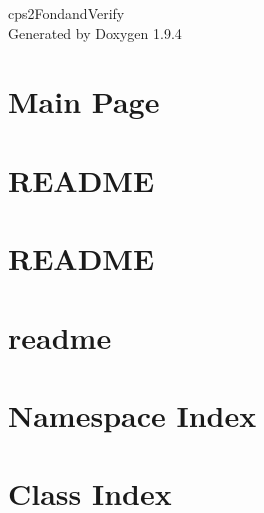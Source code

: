 \documentclass[twoside]{book}
\newcommand{\+}{\discretionary{\mbox{\scriptsize$\hookleftarrow$}}{}{}}
\newcommand{\clearemptydoublepage}{%
    \newpage{\pagestyle{empty}\cleardoublepage}%
  }
\begin{document}
  \raggedbottom
    \hypersetup{pageanchor=false,
                bookmarksnumbered=true,
                pdfencoding=unicode
               }
  \begin{titlepage}
  \vspace*{7cm}
  \begin{center}%
  {\Large cps2\+Fondand\+Verify}\\
  \vspace*{1cm}
  {\large Generated by Doxygen 1.9.4}\\
  \end{center}
  \end{titlepage}
  \clearemptydoublepage
  \tableofcontents
  \clearemptydoublepage
  \hypersetup{pageanchor=true}
\chapter{Main Page}
\label{index}\hypertarget{index}{}
\chapter{README}
\label{md_domain_blocks_clear__r_e_a_d_m_e}

\chapter{README}
\label{md_domain_blocks_clear2__r_e_a_d_m_e}

\chapter{readme}
\label{md_solutions_by_p_r_pand_a_s_p_bak_readme}

\chapter{Namespace Index}

\chapter{Class Index}

\end{document}
